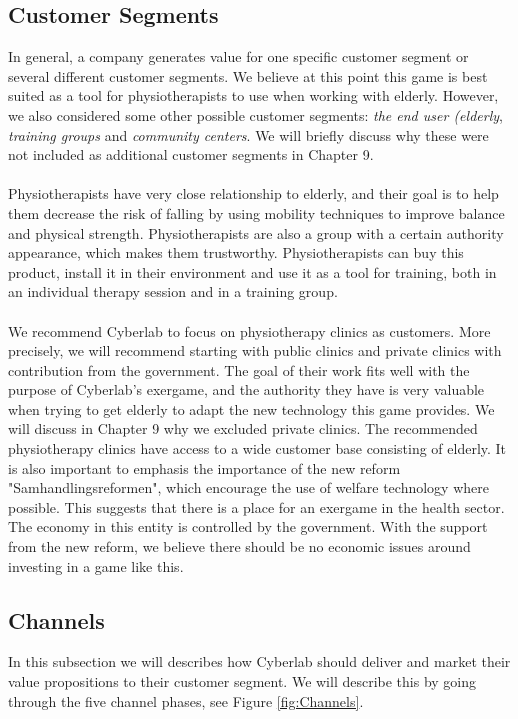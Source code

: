 \subsection{Customer Segments}
In general, a company generates value for one specific customer segment or several different customer segments. We believe at this point this game is best suited as a tool for physiotherapists to use when working with elderly. However, we also considered some other possible customer segments: \emph{the end user (elderly}, \emph{training groups} and \emph{community centers}. We will briefly discuss why these were not included as additional customer segments in Chapter 9.\\ \\ 
Physiotherapists have very close relationship to elderly, and their goal is to help them decrease the risk of falling by using mobility techniques to improve balance and physical strength. Physiotherapists are also a group with a certain authority appearance, which makes them trustworthy. Physiotherapists can buy this product, install it in their environment and use it as a tool for training, both in an individual therapy session and in a training group. \\ \\
We recommend Cyberlab to focus on physiotherapy clinics as customers. More precisely,  we will recommend starting with public clinics and private clinics with contribution from the government. The goal of their work fits well with the purpose of Cyberlab's exergame, and the authority they have is very valuable when trying to get elderly to adapt the new technology this game provides. We will discuss in Chapter 9 why we excluded private clinics. The recommended physiotherapy clinics have access to a wide customer base consisting of elderly. It is also important to emphasis the importance of the new reform "Samhandlingsreformen", which encourage the use of welfare technology where possible. This suggests that there is a place for an exergame in the health sector.  The economy in this entity is controlled by the government. With the support from the new reform, we believe there should be no economic issues around investing in a game like this. 

\subsection{Channels}
In this subsection we will describes how Cyberlab should deliver and market their value propositions to their customer segment. We will describe this by going through the five channel phases, see Figure \ref{fig:Channels}.\\ \\

